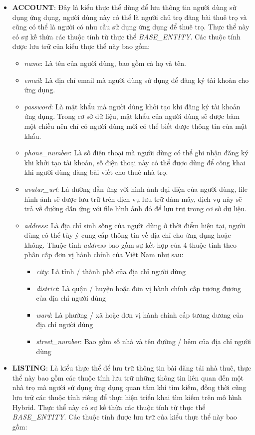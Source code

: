 \begin{itemize}
    \item \textbf{ACCOUNT}: Đây là kiểu thực thể dùng để lưu thông tin người dùng sử dụng ứng dụng, người dùng này có thể là người chủ trọ đăng bài thuê trọ và cũng có thể là người có nhu cầu sử dụng ứng dụng để thuê trọ. Thực thể này có sự kế thừa các thuộc tính từ thực thể \textit{BASE\_ENTITY}. Các thuộc tính được lưu trữ của kiểu thực thể này bao gồm:
    \begin{itemize}
        \item \textit{name}: Là tên của người dùng, bao gồm cả họ và tên.
        \item \textit{email}: Là địa chỉ email mà người dùng sử dụng để đăng ký tài khoản cho ứng dụng.
        \item \textit{password}: Là mật khẩu mà người dùng khởi tạo khi đăng ký tài khoản ứng dụng. Trong cơ sở dữ liệu, mật khẩu của người dùng sẽ được băm một chiều nên chỉ có người dùng mới có thể biết được thông tin của mật khẩu.
        \item \textit{phone\_number}: Là số điện thoại mà người dùng có thể ghi nhận đăng ký khi khởi tạo tài khoản, số điện thoại này có thể được dùng để công khai khi người dùng đăng bài viết cho thuê nhà trọ.
        \item \textit{avatar\_url}: Là đường dẫn ứng với hình ảnh đại diện của người dùng, file hình ảnh sẽ được lưu trữ trên dịch vụ lưu trữ đám mây, dịch vụ này sẽ trả về đường dẫn ứng với file hình ảnh đó để lưu trữ trong cơ sở dữ liệu.
        \item \textit{address}: Là địa chỉ sinh sống của người dùng ở thời điểm hiện tại, người dùng có thể tùy ý cung cấp thông tin về địa chỉ cho ứng dụng hoặc không. Thuộc tính \textit{address} bao gồm sự kết hợp của 4 thuộc tính theo phân cấp đơn vị hành chính của Việt Nam như sau:
        \begin{itemize}
            \item \textit{city}: Là tỉnh / thành phố của địa chỉ người dùng
            \item \textit{district}: Là quận / huyện hoặc đơn vị hành chính cấp tương đương của địa chỉ người dùng
            \item \textit{ward}: Là phường / xã hoặc đơn vị hành chính cấp tương đương của địa chỉ người dùng
            \item \textit{street\_number}: Bao gồm số nhà và tên đường / hẻm của địa chỉ người dùng
        \end{itemize}
    \end{itemize}
    \item \textbf{LISTING}: Là kiểu thực thể để lưu trữ thông tin bài đăng tải nhà thuê, thực thể này bao gồm các thuộc tính lưu trữ những thông tin liên quan đến một nhà trọ mà người sử dụng ứng dụng quan tâm khi tìm kiếm, đồng thời cũng lưu trữ các thuộc tính riêng để thực hiện triển khai tìm kiếm trên mô hình Hybrid. Thực thể này có sự kế thừa các thuộc tính từ thực thể \textit{BASE\_ENTITY}. Các thuộc tính được lưu trữ của kiểu thực thể này bao gồm:

\end{itemize}
